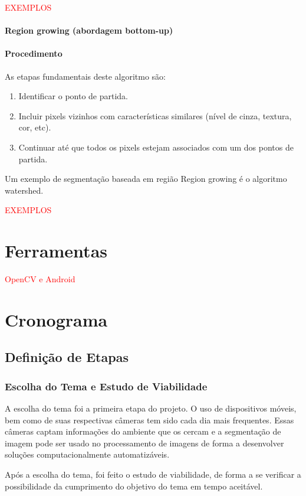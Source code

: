 \textcolor{red}{EXEMPLOS}


\subsubsection{Region growing (abordagem bottom-up)}
\subsubsection*{Procedimento}
As etapas fundamentais deste algoritmo são: 
\begin{enumerate}
    \item Identificar o ponto de partida.
    \item Incluir pixels vizinhos com características similares (nível de cinza, textura, cor, etc).
    \item Continuar até que todos os pixels estejam associados com um dos pontos de partida.
\end{enumerate}
Um exemplo de segmentação baseada em região Region growing é o algoritmo watershed.

\textcolor{red}{EXEMPLOS}


\chapter{Ferramentas}

\textcolor{red}{OpenCV e Android}


\chapter{Cronograma}
\section{Definição de Etapas}
\subsection{Escolha do Tema e Estudo de Viabilidade}
A escolha do tema foi a primeira etapa do projeto. O uso de dispositivos móveis, bem como de suas respectivas câmeras tem sido cada dia mais frequentes. Essas câmeras captam informações do ambiente que os cercam e a segmentação de imagem pode ser usado no processamento de imagens de forma a desenvolver soluções computacionalmente automatizáveis.

Após a escolha do tema, foi feito o estudo de viabilidade, de forma a se verificar a possibilidade da cumprimento do objetivo do tema em tempo aceitável.

